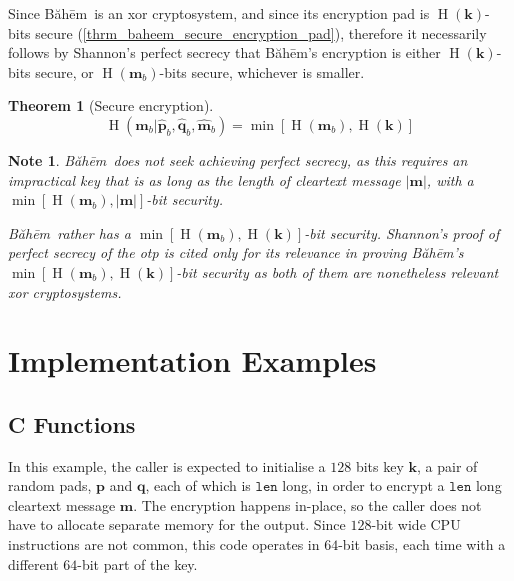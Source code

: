 \documentclass[twocolumn,hidelinks]{article}
\newcommand{\baheem}{Băhēm}
\DeclareMathOperator{\entropy}{H}
\newtheorem{theorem}{Theorem}
\newtheorem{note}{Note}
\begin{document}
Since \baheem\ is an \gls{xor} cryptosystem, and since its encryption pad
is $\entropy(\mathbf{k})$-bits secure
(\cref{thrm_baheem_secure_encryption_pad}), therefore it necessarily
follows by Shannon's perfect secrecy \cite{perfect_secrecy} that \baheem's
encryption is either $\entropy(\mathbf{k})$-bits secure, or
$\entropy(\mathbf{m}_b)$-bits secure, whichever is smaller.

\begin{theorem}[Secure encryption]
    \[
        \entropy(
            \mathbf{m}_b
            | \mathbf{\hat p}_b,
              \mathbf{\hat q}_b,
              \mathbf{\hat m}_b
        )
        = \min[\entropy(\mathbf{m}_b), \entropy(\mathbf{k})]
    \]
    \label{thrm_baheem_secure}
\end{theorem}

\begin{note}
    \baheem\ does not seek achieving perfect secrecy, as this requires an
    impractical key that is as long as the length of cleartext message
    $|\mathbf{m}|$, with a $\min[\entropy(\mathbf{m}_b), |\mathbf{m}|]$-bit
    security.

    \baheem\ rather has a $\min[\entropy(\mathbf{m}_b),
    \entropy(\mathbf{k})]$-bit security. Shannon's proof of perfect secrecy
    of the \gls{otp} is cited only for its relevance in proving \baheem's
    $\min[\entropy(\mathbf{m}_b), \entropy(\mathbf{k})]$-bit security as
    both of them are nonetheless relevant \gls{xor} cryptosystems.
\end{note}


\section{Implementation Examples}
\subsection{C Functions}
In this example, the caller is expected to initialise a $128$ bits key
$\mathbf{k}$, a pair of random pads, $\mathbf{p}$ and $\mathbf{q}$, each of
which is $\mathtt{len}$ long, in order to encrypt a $\mathtt{len}$ long
cleartext message $\mathbf{m}$. The encryption happens in-place, so the
caller does not have to allocate separate memory for the output. Since
$128$-bit wide CPU instructions are not common, this code operates in
$64$-bit basis, each time with a different $64$-bit part of the key.
\end{document}
